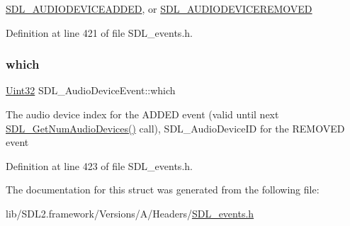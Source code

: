 \mbox{\hyperlink{_s_d_l__events_8h_a3b589e89be6b35c02e0dd34a55f3fccaadb3154654baf003910e75d74b507a82b}{S\+D\+L\+\_\+\+A\+U\+D\+I\+O\+D\+E\+V\+I\+C\+E\+A\+D\+D\+ED}}, or \mbox{\hyperlink{_s_d_l__events_8h_a3b589e89be6b35c02e0dd34a55f3fccaad56f8934fe24ee4c0cd9329e3c57c0c2}{S\+D\+L\+\_\+\+A\+U\+D\+I\+O\+D\+E\+V\+I\+C\+E\+R\+E\+M\+O\+V\+ED}} 

Definition at line 421 of file S\+D\+L\+\_\+events.\+h.

\mbox{\label{struct_s_d_l___audio_device_event_ac91d70fd4e1dd596185fed061388896c}} 
\subsubsection{\texorpdfstring{which}{which}}
{\footnotesize\ttfamily \mbox{\hyperlink{_s_d_l__stdinc_8h_add440eff171ea5f55cb00c4a9ab8672d}{Uint32}} S\+D\+L\+\_\+\+Audio\+Device\+Event\+::which}

The audio device index for the A\+D\+D\+ED event (valid until next \mbox{\hyperlink{_s_d_l__audio_8h_ae165f64b3f0fecfebe1c97731600ca59}{S\+D\+L\+\_\+\+Get\+Num\+Audio\+Devices()}} call), S\+D\+L\+\_\+\+Audio\+Device\+ID for the R\+E\+M\+O\+V\+ED event 

Definition at line 423 of file S\+D\+L\+\_\+events.\+h.



The documentation for this struct was generated from the following file\+:\begin{DoxyCompactItemize}
\item 
lib/\+S\+D\+L2.\+framework/\+Versions/\+A/\+Headers/\mbox{\hyperlink{_s_d_l__events_8h}{S\+D\+L\+\_\+events.\+h}}\end{DoxyCompactItemize}
